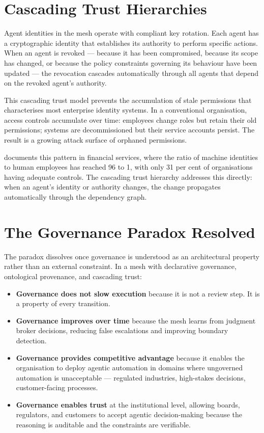\section{Cascading Trust Hierarchies}

Agent identities in the mesh operate with compliant key rotation. Each agent has a cryptographic identity that establishes its authority to perform specific actions. When an agent is revoked --- because it has been compromised, because its scope has changed, or because the policy constraints governing its behaviour have been updated --- the revocation cascades automatically through all agents that depend on the revoked agent's authority.

This cascading trust model prevents the accumulation of stale permissions that characterises most enterprise identity systems. In a conventional organisation, access controls accumulate over time: employees change roles but retain their old permissions; systems are decommissioned but their service accounts persist. The result is a growing attack surface of orphaned permissions.

\textcite{CyberArk2025} documents this pattern in financial services, where the ratio of machine identities to human employees has reached 96 to 1, with only 31 per cent of organisations having adequate controls. The cascading trust hierarchy addresses this directly: when an agent's identity or authority changes, the change propagates automatically through the dependency graph.

\section{The Governance Paradox Resolved}

The paradox dissolves once governance is understood as an architectural property rather than an external constraint. In a mesh with declarative governance, ontological provenance, and cascading trust:

\begin{itemize}
  \item \textbf{Governance does not slow execution} because it is not a review step. It is a property of every transition.
  \item \textbf{Governance improves over time} because the mesh learns from judgment broker decisions, reducing false escalations and improving boundary detection.
  \item \textbf{Governance provides competitive advantage} because it enables the organisation to deploy agentic automation in domains where ungoverned automation is unacceptable --- regulated industries, high-stakes decisions, customer-facing processes.
  \item \textbf{Governance enables trust} at the institutional level, allowing boards, regulators, and customers to accept agentic decision-making because the reasoning is auditable and the constraints are verifiable.
\end{itemize}

